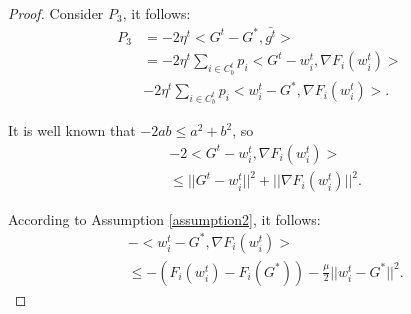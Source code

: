 \begin{proof}
Consider $P_3$, it follows:
\begin{equation}
    \begin{split}\label{ineq3}
	P_3
	& = -2\eta^t<G^t-G^*,\bar{g^t}> \\
	& = -2\eta^t\sum\limits_{i\in C_b^t}p_i<G^t-w_i^t,\nabla F_i(w_i^t)>\\
	& -2\eta^t\sum\limits_{i\in C_b^t}p_i<w_i^t-G^*,\nabla F_i(w_i^t)>.
    \end{split} 
\end{equation}

It is well known that $-2ab\leq a^2+b^2$, so
\begin{equation}
    \begin{split}\label{ineq4}
    & -2<G^t-w_i^t,\nabla F_i(w_i^t)>\\ 
    & \leq ||G^t-w_i^t||^2+||\nabla F_i(w_i^t)||^2 .
    \end{split}
\end{equation}

According to Assumption \ref{assumption2}, it follows:
\begin{equation}
    \begin{split}\label{ineq5}
    & -<w_i^t-G^*,\nabla F_i(w_i^t)> \\
    & \leq -(F_i(w_i^t)-F_i(G^*)) -\frac{\mu}{2}||w_i^t-G^*||^2 .
    \end{split}
\end{equation}


\end{proof}
